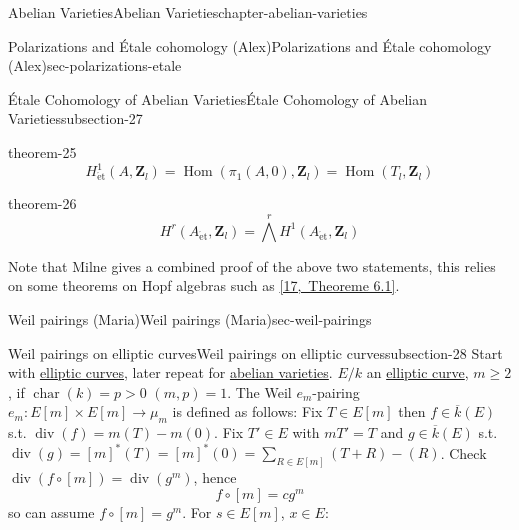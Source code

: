 \documentclass[oneside,10pt,]{book}
\numberwithin{equation}{section}
\newcommand{\lb}{[}
\newcommand{\rb}{]}
\newcommand{\ZZ}{\mathbf{Z}}
\newcommand{\et}{\mathrm{\acute{e}t}}
\DeclareMathOperator{\Hom}{Hom}
\DeclareMathOperator{\divisor}{div}
\DeclareMathOperator{\characteristic}{char}
\newcommand{\gt}{>}
\begin{document}
\begin{chapterptx}{Abelian Varieties}{}{Abelian Varieties}{}{}{chapter-abelian-varieties}
\begin{sectionptx}{Polarizations and Étale cohomology (Alex)}{}{Polarizations and Étale cohomology (Alex)}{}{}{sec-polarizations-etale}
\begin{subsectionptx}{Étale Cohomology of Abelian Varieties}{}{Étale Cohomology of Abelian Varieties}{}{}{subsection-27}
\begin{equation*}
\end{equation*}
%
\begin{theorem}{}{}{theorem-25}%
\hypertarget{p-296}{}%
%
\begin{equation*}
H^1_\et(A , \ZZ_l) = \Hom(\pi_1(A,0), \ZZ_l) = \Hom(T_l,\ZZ_l)
\end{equation*}
%
\end{theorem}
\begin{theorem}{}{}{theorem-26}%
\hypertarget{p-297}{}%
%
\begin{equation*}
H^r(A_\et, \ZZ_l) = \bigwedge^r H^1(A_\et, \ZZ_l)
\end{equation*}
%
\end{theorem}
\hypertarget{p-298}{}%
Note that Milne gives a combined proof of the above two statements, this relies on some theorems on Hopf algebras such as \hyperlink{bib-borel-hopf}{[17,~Theoreme 6.1]}.%
\end{subsectionptx}
\end{sectionptx}
%
%
\typeout{************************************************}
\typeout{************************************************}
%
\begin{sectionptx}{Weil pairings (Maria)}{}{Weil pairings (Maria)}{}{}{sec-weil-pairings}
%
%
\typeout{************************************************}
\typeout{************************************************}
%
\begin{subsectionptx}{Weil pairings on elliptic curves}{}{Weil pairings on elliptic curves}{}{}{subsection-28}
\hypertarget{p-299}{}%
Start with \hyperref[def-supersing-isog-ec]{elliptic curves}, later repeat for \hyperref[def-buntes-abvar]{abelian varieties}. \(E/k\) an \hyperref[def-supersing-isog-ec]{elliptic curve}, \(m\ge 2\), if \(\characteristic(k) = p \gt 0\) \((m,p) = 1\). The Weil \(e_m\)-pairing \(e_m \colon E\lb m\rb \times E\lb m \rb \to \mu_m\) is defined as follows: Fix \(T\in E\lb m \rb\) then \(f\in \overline  k (E)\) s.t. \(\divisor(f) = m(T) - m(0)\). Fix \(T' \in E\) with \(mT' = T\) and \(g\in \overline k(E)\) s.t. \(\divisor(g) = \lb m \rb^*(T) = \lb m \rb^*(0)= \sum_{R\in E\lb m \rb} (T+R) - (R)\). Check \(\divisor (f\circ \lb m \rb) = \divisor(g^m)\), hence%
\begin{equation*}
f\circ [m] = c g^m
\end{equation*}
so can assume \(f\circ \lb m \rb = g^m\). For \(s \in E\lb m \rb\), \(x\in E\):%
\begin{equation*}

\end{equation*}
\end{subsectionptx}
\end{sectionptx}
\end{chapterptx}
\end{document}
